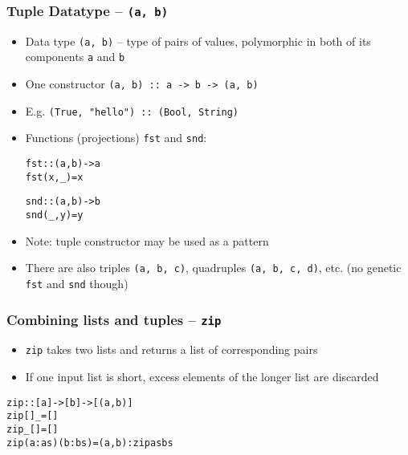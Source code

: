 \documentclass[final,handout]{beamer}
\begin{document}
\begin{frame}[fragile]
    \frametitle{Tuple Datatype -- \texttt{(a, b)}}

    \begin{itemize}
        \item<1-> Data type \texttt{(a, b)} -- type of pairs of values, polymorphic
            in both of its components \texttt{a} and \texttt{b}
        \item<2-> One constructor \texttt{(a, b) :: a -> b -> (a, b)}
        \item<3-> E.g. \texttt{(True, "hello") :: (Bool, String)}
        \item<4-> Functions (projections) \texttt{fst} and \texttt{snd}:

            \begin{alltt}
        fst :: (a, b) -> a
        fst (x, _) = x

        snd :: (a, b) -> b
        snd (_, y) = y
            \end{alltt}

        \item<5-> {\color{green} Note:} tuple constructor may be used as a pattern
        \item<6-> There are also triples \texttt{(a, b, c)}, quadruples \texttt{(a,
            b, c, d)}, etc. (no genetic \texttt{fst} and \texttt{snd} though)
    \end{itemize}


\end{frame}


\begin{frame}[fragile]
    \frametitle{Combining lists and tuples -- \texttt{zip}}

    \begin{itemize}
        \item \texttt{zip} takes two lists and returns a list of corresponding pairs
        \item If one input list is short, excess elements of the longer list are
            discarded

    \pause
    \end{itemize}
            \begin{alltt}
    zip :: [a] -> [b] -> [(a,b)]
    zip []     _      = []
    zip _      []     = []
    zip (a:as) (b:bs) = (a,b) : zip as bs
        \end{alltt}
\end{frame}
\end{document}
